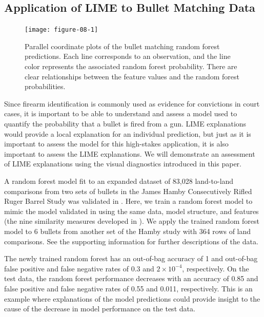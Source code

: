 \documentclass[AMS,STIX2COL]{WileyNJD-v2}\usepackage[]{graphicx}\usepackage[]{color}
\newenvironment{knitrout}{}{} %
\begin{document}
\subsection{Application of LIME to Bullet Matching Data}

\begin{figure}[!thp]
\begin{knitrout}
\color{fgcolor}

{\centering \texttt{[image: figure-08-1]} 

}



\end{knitrout}
\caption{Parallel coordinate plots of the bullet matching random forest predictions. Each line corresponds to an observation, and the line color represents the associated random forest probability. There are clear relationships between the feature values and the random forest probabilities.}
\label{fig:figure-08}
\end{figure}

Since firearm identification is commonly used as evidence for convictions in court cases, it is important to be able to understand and assess a model used to quantify the probability that a bullet is fired from a gun. LIME explanations would provide a local explanation for an individual prediction, but just as it is important to assess the model for this high-stakes application, it is also important to assess the LIME explanations. We will demonstrate an assessment of LIME explanations using the visual diagnostics introduced in this paper.

A random forest model fit to an expanded dataset of 83,028 land-to-land comparisons from two sets of bullets in the James Hamby Consecutively Rifled Ruger Barrel Study \citep{hamby:2009} was validated in \citet{vanderplas:2020}. Here, we train a random forest model to mimic the model validated in \citet{vanderplas:2020} using the same data, model structure, and features (the nine similarity measures developed in \citet{hare:2017}). We apply the trained random forest model to 6 bullets from another set of the Hamby study with 364 rows of land comparisons. See the supporting information for further descriptions of the data. 

The newly trained random forest has an out-of-bag accuracy of 1 and out-of-bag false positive and false negative rates of 0.3 and \ensuremath{2\times 10^{-4}}, respectively. On the test data, the random forest performance decreases with an accuracy of 0.85 and false positive and false negative rates of 0.55 and 0.011, respectively. This is an example where explanations of the model predictions could provide insight to the cause of the decrease in model performance on the test data.
\end{document}
